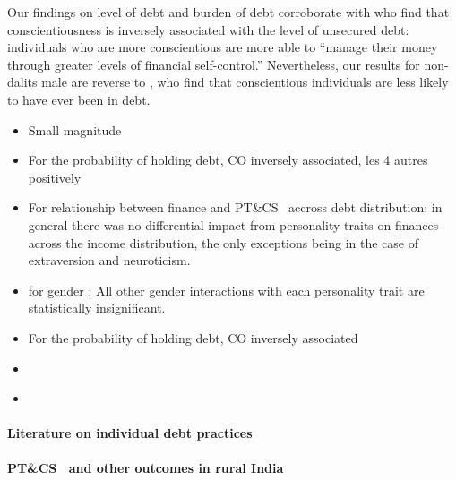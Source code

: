 \documentclass[a4paper, 11pt, onecolumn]{article}
\newcommand{\PTCS}{PT\&CS}
\begin{document}
Our findings on level of debt and burden of debt corroborate with \cite{Brown2014, Donnelly2012} who find that conscientiousness is inversely associated with the level of unsecured debt: individuals who are more conscientious are more able to ``manage their money through greater levels of financial self-control.''
Nevertheless, our results for non-dalits male are reverse to \cite{Nyhus2001, Brown2014}, who find that conscientious individuals are less likely to have ever been in debt.




\cite{Brown2014}
\begin{itemize}
\item Small magnitude
\item For the probability of holding debt, CO inversely associated, les 4 autres positively
\item For relationship between finance and \PTCS~ accross debt distribution: in general there was no differential impact from personality traits on finances across the income distribution, the only exceptions being in the case of extraversion and neuroticism.
\item for gender : All other gender interactions with each personality trait are statistically insignificant.
\end{itemize}

\cite{Donnelly2012}
\begin{itemize}
\item For the probability of holding debt, CO inversely associated
\end{itemize}


\cite{Forlicz2019}
\begin{itemize}
\item 
\end{itemize}

\cite{Bertaut2002}
\begin{itemize}
\item 
\end{itemize}

\paragraph{Literature on individual debt practices}

\paragraph{\PTCS~ and other outcomes in rural India}
\end{document}
